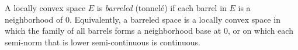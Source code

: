 A locally convex space $E$ is \textit{barreled} (tonnelé) if each barrel in $E$ is a neighborhood of $0$. Equivalently, a barreled space is a locally convex space in which the family of all barrels forms a neighborhood base at $0$, or on which each semi-norm that is lower semi-continuous is continuous.
